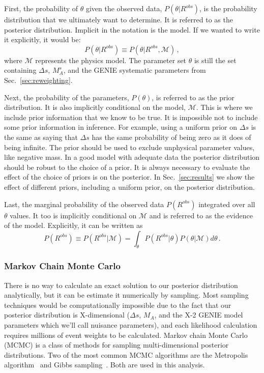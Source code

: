     
    First, the probability of $\theta$ given the observed data,
    $P(\theta|R^{obs})$, is the probability distribution that we ultimately
    want to determine. It is referred to as the posterior distribution.
    Implicit in the notation is the model. If we wanted to write it explicitly,
    it would be:
    \begin{equation*}
      P(\theta|R^{obs})\equiv P(\theta|R^{obs},\mathcal{M}) \,,
    \end{equation*}
    where $\mathcal{M}$ represents the physics model. The parameter set
    $\theta$ is still the set containing $\Delta s$, $M_A^s$, and the GENIE
    systematic parameters from Sec.~\ref{sec:reweighting}.

    Next, the probability of the parameters, $P(\theta)$, is referred to as the
    prior distribution. It is also implicitly conditional on the model,
    $\mathcal{M}$. This is where we include prior information that we know to
    be true. It is impossible not to include some prior information in
    inference. For example, using a uniform prior on $\Delta s$ is the same as
    saying that $\Delta s$ has the same probability of being zero as it does of
    being infinite. The prior should be used to exclude unphysical parameter
    values, like negative mass. In a good model with adequate data the
    posterior distribution should be robust to the choice of a prior. It is
    always necessary to evaluate the effect of the choice of priors is on the
    posterior. In Sec.~\ref{sec:results} we show the effect of different
    priors, including a uniform prior, on the posterior distribution.

    Last, the marginal probability of the observed data $P(R^{obs})$ integrated
    over all $\theta$ values.  It too is implicitly conditional on
    $\mathcal{M}$ and is referred to as the evidence of the model. Explicitly,
    it can be written as
    \begin{equation*}
      P(R^{obs}) \equiv P(R^{obs}|\mathcal{M}) 
          = \int_{\theta}P(R^{obs}|\theta)P(\theta|\mathcal{M})d\theta \,.
    \end{equation*}

  \subsubsection{Markov Chain Monte Carlo}
    There is no way to calculate an exact solution to our posterior
    distribution analytically, but it can be estimate it numerically by
    sampling. Most sampling techniques would be computationally impossible due
    to the fact that our posterior distribution is X-dimensional ($\Delta s$,
    $M_A$, and the X-2 GENIE model parameters which we'll call nuisance
    parameters), and each likelihood calculation requires millions of event
    weights to be calculated. Markov chain Monte Carlo (MCMC) is a class of
    methods for sampling multi-dimensional posterior distributions. Two of the
    most common MCMC algorithms are the Metropolis algorithm~\cite{Metropolis}
    and Gibbs sampling~\cite{Gibbs}. Both are used in this analysis.

